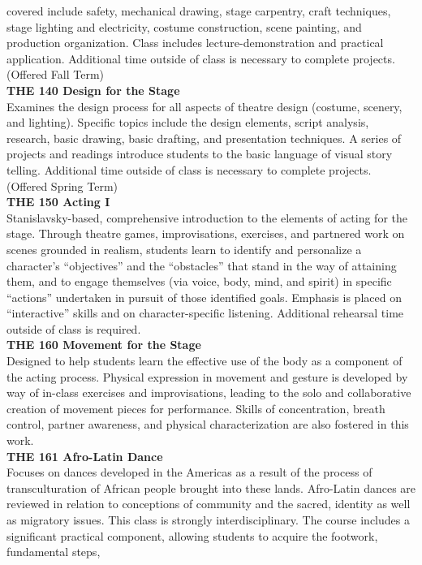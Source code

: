 \documentclass[
  letterpaper,
]{scrbook}
\begin{document}
covered include safety, mechanical drawing, stage carpentry, craft
techniques, stage lighting and electricity, costume construction, scene
painting, and production organization. Class includes
lecture-demonstration and practical application. Additional time outside
of class is necessary to complete projects. (Offered Fall Term)\\
\textbf{THE 140 Design for the Stage}\\
Examines the design process for all aspects of theatre design (costume,
scenery, and lighting). Specific topics include the design elements,
script analysis, research, basic drawing, basic drafting, and
presentation techniques. A series of projects and readings introduce
students to the basic language of visual story telling. Additional time
outside of class is necessary to complete projects. (Offered Spring
Term)\\
\textbf{THE 150 Acting I}\\
Stanislavsky-based, comprehensive introduction to the elements of acting
for the stage. Through theatre games, improvisations, exercises, and
partnered work on scenes grounded in realism, students learn to identify
and personalize a character's ``objectives'' and the ``obstacles'' that
stand in the way of attaining them, and to engage themselves (via voice,
body, mind, and spirit) in specific ``actions'' undertaken in pursuit of
those identified goals. Emphasis is placed on ``interactive'' skills and
on character-specific listening. Additional rehearsal time outside of
class is required.\\
\textbf{THE 160 Movement for the Stage}\\
Designed to help students learn the effective use of the body as a
component of the acting process. Physical expression in movement and
gesture is developed by way of in-class exercises and improvisations,
leading to the solo and collaborative creation of movement pieces for
performance. Skills of concentration, breath control, partner awareness,
and physical characterization are also fostered in this work.\\
\textbf{THE 161 Afro-Latin Dance}\\
Focuses on dances developed in the Americas as a result of the process
of transculturation of African people brought into these lands.
Afro-Latin dances are reviewed in relation to conceptions of community
and the sacred, identity as well as migratory issues. This class is
strongly interdisciplinary. The course includes a significant practical
component, allowing students to acquire the footwork, fundamental steps,
\end{document}
